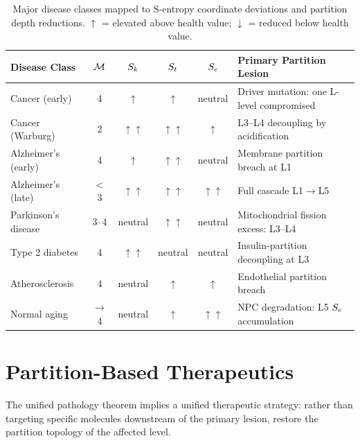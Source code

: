 \begin{table}[htbp]
\centering
\caption{Major disease classes mapped to S-entropy coordinate deviations
         and partition depth reductions.
         $\uparrow$ = elevated above health value;
         $\downarrow$ = reduced below health value.}
\label{tab:disease_sentropy}
\begin{tabularx}{\textwidth}{@{} l c c c c X @{}}
  \toprule
  Disease Class & $\mathcal{M}$ & $S_k$ & $S_t$ & $S_e$ & Primary Partition Lesion \\
  \midrule
  Cancer (early) & 4 & $\uparrow$ & $\uparrow$ & neutral & Driver mutation: one L-level compromised \\
  Cancer (Warburg) & 2 & $\uparrow\uparrow$ & $\uparrow\uparrow$ & $\uparrow$ & L3--L4 decoupling by acidification \\
  Alzheimer's (early) & 4 & $\uparrow$ & $\uparrow\uparrow$ & neutral & Membrane partition breach at L1 \\
  Alzheimer's (late) & $<$3 & $\uparrow\uparrow$ & $\uparrow\uparrow$ & $\uparrow\uparrow$ & Full cascade L1$\to$L5 \\
  Parkinson's disease & 3--4 & neutral & $\uparrow\uparrow$ & neutral & Mitochondrial fission excess: L3--L4 \\
  Type 2 diabetes & 4 & $\uparrow\uparrow$ & neutral & neutral & Insulin-partition decoupling at L3 \\
  Atherosclerosis & 4 & neutral & $\uparrow$ & $\uparrow$ & Endothelial partition breach \\
  Normal aging & $\to$4 & neutral & $\uparrow$ & $\uparrow\uparrow$ & NPC degradation: L5 $S_e$ accumulation \\
  \bottomrule
\end{tabularx}
\end{table}

\section{Partition-Based Therapeutics}
\label{sec:partition_therapeutics}

The unified pathology theorem implies a unified therapeutic strategy: rather
than targeting specific molecules downstream of the primary lesion, restore
the partition topology of the affected level.

